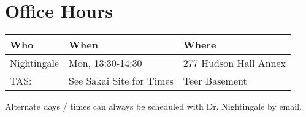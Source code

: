 \section{Office Hours}
\begin{center}
    \begin{tabular}{|l|l|l|} \hline
        \textbf{Who} & \textbf{When} & \textbf{Where} \\ \hline
        Nightingale & Mon, 13:30-14:30 & 277 Hudson Hall Annex \\ \hline
        TAS: &See Sakai Site for Times & Teer Basement \\ \hline
    \end{tabular}
\end{center}

Alternate days / times can always be scheduled with Dr. Nightingale by email.
